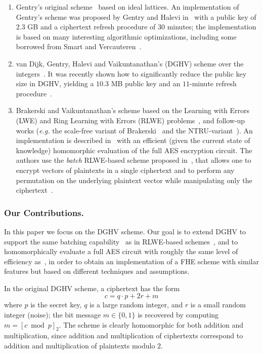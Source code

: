 \documentclass[11pt]{llncs}
\newcommand{\eg}{\textsl{e.g.}\xspace}
\begin{document}
\begin{enumerate}
\item Gentry's original scheme~\cite{GenPhD} based on ideal
  lattices.  An implementation of Gentry's scheme was proposed by
  Gentry and Halevi
  in~\cite{GH2011} with a public key of $2.3$ GB and a ciphertext
  refresh procedure of $30$ minutes; the implementation is based on
  many interesting algorithmic
  optimizations, including some borrowed from Smart and Vercauteren~\cite{SV2010}.

\smallskip

\item van Dijk, Gentry, Halevi and Vaikuntanathan's (DGHV) scheme over the
  integers~\cite{vDGHV2010}. It was recently shown how to significantly
  reduce the public key size in DGHV, yielding a $10.3$ MB public key and
  an $11$-minute refresh procedure~\cite{CNT2012}.

\smallskip

\item Brakerski and Vaikuntanathan's scheme based on the Learning with
  Errors (LWE) and Ring Learning with Errors (RLWE)
  problems~\cite{BV2011a,BV2011b}, and follow-up works (\eg the scale-free variant of Brakerski~\cite{Bra2012} and the NTRU-variant~\cite{LTV2012}). An implementation is described in~\cite{GHS2012c} with an 
  efficient (given the current state of knowledge)
  homomorphic evaluation of the full AES encryption circuit.  The
  authors use the \emph{batch} RLWE-based scheme proposed in~\cite{BGV2012,GHS2012a},
  that allows one to
 encrypt vectors of plaintexts in a single ciphertext and to
 perform any permutation on the underlying plaintext vector while
 manipulating only the ciphertext~\cite{SV2011}. 
\end{enumerate}

\subsubsection{Our Contributions.} 

In this paper we focus on the DGHV scheme. Our goal is to extend DGHV to
support the same batching capability~\cite{SV2011} as in RLWE-based
schemes~\cite{BV2011a,BV2011b}, and to homomorphically evaluate a full AES
circuit with roughly the same level of efficiency as~\cite{GHS2012c}, in
order to obtain an implementation of a FHE scheme with similar features
but based on different techniques and assumptions. 

In the original DGHV scheme, a ciphertext has the form
$$ c= q \cdot p + 2r+m$$
where $p$ is the secret key, $q$ is a large random integer, and $r$ is
a small random integer (noise); the bit message $m\in\{0,1\}$ is recovered by computing
$m=[c \bmod p]_2$.  The scheme is clearly homomorphic for both addition
and multiplication, since addition and multiplication of ciphertexts
correspond to addition and multiplication of plaintexts modulo
$2$. 
\end{document}
